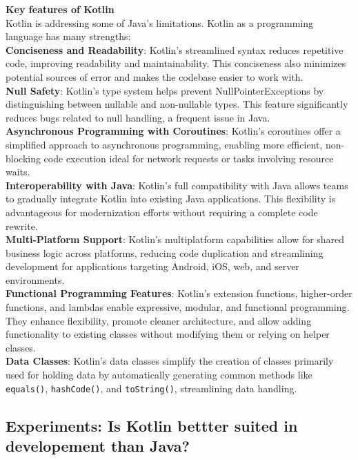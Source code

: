 \noindent \textbf{Key features of Kotlin}
\\
\noindent Kotlin is addressing some of Java's limitations. Kotlin as a programming language has many strengths:
\\
\textbf{Conciseness and Readability}: Kotlin’s streamlined syntax reduces repetitive code, improving readability and maintainability. This conciseness also minimizes potential sources of error and makes the codebase easier to work with.
\\
\textbf{Null Safety}: Kotlin’s type system helps prevent NullPointerExceptions by distinguishing between nullable and non-nullable types. This feature significantly reduces bugs related to null handling, a frequent issue in Java.
\\
\textbf{Asynchronous Programming with Coroutines}: Kotlin’s coroutines offer a simplified approach to asynchronous programming, enabling more efficient, non-blocking code execution ideal for network requests or tasks involving resource waits.
\\
\textbf{Interoperability with Java}: Kotlin’s full compatibility with Java allows teams to gradually integrate Kotlin into existing Java applications. This flexibility is advantageous for modernization efforts without requiring a complete code rewrite.
\\
\textbf{Multi-Platform Support}: Kotlin’s multiplatform capabilities allow for shared business logic across platforms, reducing code duplication and streamlining development for applications targeting Android, iOS, web, and server environments.
\\
\textbf{Functional Programming Features}: Kotlin's extension functions, higher-order functions, and lambdas enable expressive, modular, and functional programming. They enhance flexibility, promote cleaner architecture, and allow adding functionality to existing classes without modifying them or relying on helper classes.
\\
\textbf{Data Classes}: Kotlin’s data classes simplify the creation of classes primarily used for holding data by automatically generating common methods like \texttt{equals()}, \texttt{hashCode()}, and \texttt{toString()}, streamlining data handling.


\subsection{Experiments: Is Kotlin bettter suited in developement than Java? }

